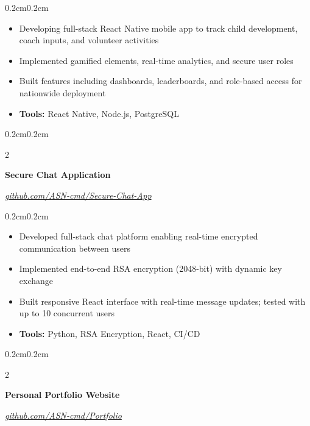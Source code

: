 \documentclass[10pt, letterpaper]{article}
\newenvironment{highlights}{
    \begin{itemize}[
        topsep=0.10cm,
        parsep=0.10cm,
        partopsep=0pt,
        itemsep=0pt,
        leftmargin=0.4cm + 10pt
    ]
}{\end{itemize}}
\newenvironment{onecolentry}{
    \begin{adjustwidth}{0.2cm}{0.2cm}
}{\end{adjustwidth}}
\newenvironment{twocolentry}[2][]{
    \onecolentry
    \def\secondColumn{#2}
    \setcolumnwidth{\fill, 4.5cm}
    \begin{paracol}{2}
}{
    \switchcolumn \raggedleft \secondColumn
    \end{paracol}
    \endonecolentry
}
\begin{document}
    \vspace{0.10 cm}
    \begin{onecolentry}
        \begin{highlights}
            \item Developing full-stack React Native mobile app to track child development, coach inputs, and volunteer activities
            \item Implemented gamified elements, real-time analytics, and secure user roles
            \item Built features including dashboards, leaderboards, and role-based access for nationwide deployment
            \item \textbf{Tools:} React Native, Node.js, PostgreSQL
        \end{highlights}
    \end{onecolentry}

    \vspace{0.2 cm}

    \begin{twocolentry}{
        \textit{\href{https://github.com/ASN-cmd/Secure-Chat-App}{github.com/ASN-cmd/Secure-Chat-App}}
    }
        \textbf{Secure Chat Application}
    \end{twocolentry}
    
    \vspace{0.10 cm}
    \begin{onecolentry}
        \begin{highlights}
            \item Developed full-stack chat platform enabling real-time encrypted communication between users
            \item Implemented end-to-end RSA encryption (2048-bit) with dynamic key exchange
            \item Built responsive React interface with real-time message updates; tested with up to 10 concurrent users
            \item \textbf{Tools:} Python, RSA Encryption, React, CI/CD
        \end{highlights}
    \end{onecolentry}

    \vspace{0.2 cm}

    \begin{twocolentry}{
        \textit{\href{https://github.com/ASN-cmd/Portfolio}{github.com/ASN-cmd/Portfolio}}
    }
        \textbf{Personal Portfolio Website}
    \end{twocolentry}
    
\end{document}
